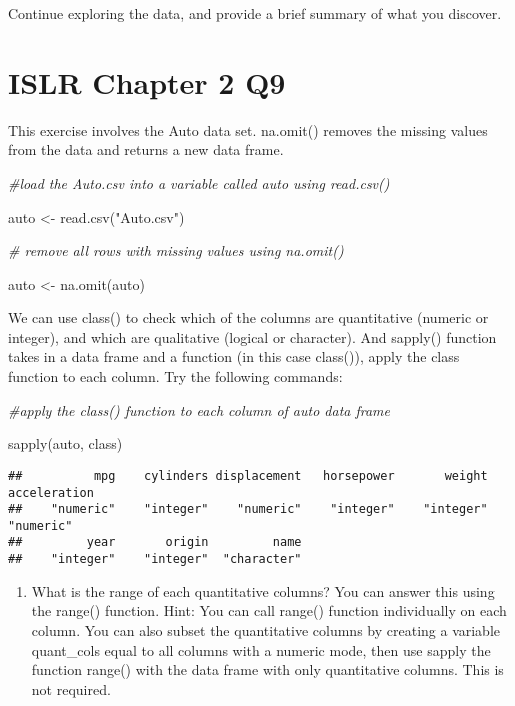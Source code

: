 \documentclass[
]{article}
\newenvironment{Shaded}{\begin{snugshade}}{\end{snugshade}}
\newcommand{\CommentTok}[1]{\textcolor[rgb]{0.56,0.35,0.01}{\textit{#1}}}
\newcommand{\FunctionTok}[1]{\textcolor[rgb]{0.00,0.00,0.00}{#1}}
\newcommand{\NormalTok}[1]{#1}
\newcommand{\OtherTok}[1]{\textcolor[rgb]{0.56,0.35,0.01}{#1}}
\newcommand{\StringTok}[1]{\textcolor[rgb]{0.31,0.60,0.02}{#1}}
\providecommand{\tightlist}{%
  \setlength{\itemsep}{0pt}\setlength{\parskip}{0pt}}
\begin{document}
Continue exploring the data, and provide a brief summary of what you
discover.

\hypertarget{islr-chapter-2-q9}{%
\section{ISLR Chapter 2 Q9}\label{islr-chapter-2-q9}}

This exercise involves the Auto data set. na.omit() removes the missing
values from the data and returns a new data frame.

\begin{Shaded}
\begin{Highlighting}[]
\CommentTok{\#load the Auto.csv into a variable called auto using read.csv()}

\NormalTok{auto }\OtherTok{\textless{}{-}} \FunctionTok{read.csv}\NormalTok{(}\StringTok{"Auto.csv"}\NormalTok{)}

\CommentTok{\# remove all rows with missing values using na.omit()}

\NormalTok{auto }\OtherTok{\textless{}{-}} \FunctionTok{na.omit}\NormalTok{(auto)}
\end{Highlighting}
\end{Shaded}

We can use class() to check which of the columns are quantitative
(numeric or integer), and which are qualitative (logical or character).
And sapply() function takes in a data frame and a function (in this case
class()), apply the class function to each column. Try the following
commands:

\begin{Shaded}
\begin{Highlighting}[]
\CommentTok{\#apply the class() function to each column of auto data frame}

\FunctionTok{sapply}\NormalTok{(auto, class)}
\end{Highlighting}
\end{Shaded}

\begin{verbatim}
##          mpg    cylinders displacement   horsepower       weight acceleration 
##    "numeric"    "integer"    "numeric"    "integer"    "integer"    "numeric" 
##         year       origin         name 
##    "integer"    "integer"  "character"
\end{verbatim}

\begin{enumerate}
\def\labelenumi{\alph{enumi}.}
\tightlist
\item
  What is the range of each quantitative columns? You can answer this
  using the range() function. Hint: You can call range() function
  individually on each column. You can also subset the quantitative
  columns by creating a variable quant\_cols equal to all columns with a
  numeric mode, then use sapply the function range() with the data frame
  with only quantitative columns. This is not required.
\end{enumerate}
\end{document}
